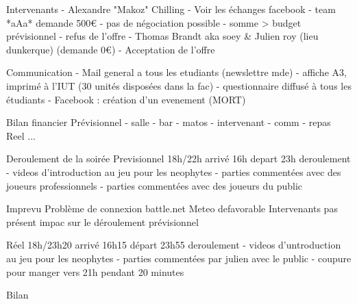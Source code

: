 	Intervenants
    - Alexandre "Makoz" Chilling
      - Voir les échanges facebook
		- team *aAa* demande 500€
                    - pas de négociation possible
                    - somme > budget prévisionnel
                    - refus de l'offre
    - Thomas Brandt aka soey & Julien roy (lieu dunkerque) (demande 0€)
        - Acceptation de l'offre

        Communication
                - Mail general a tous les etudiants (newslettre mde)
                - affiche A3, imprimé à l'IUT (30 unités disposées dans la fac)
                - questionnaire diffusé à tous les étudiants
                - Facebook : création d'un evenement (MORT)

        Bilan financier
                Prévisionnel
                    - salle
                    - bar
                    - matos
                    - intervenant
                    - comm
                    - repas
                Reel
                   ...

        Deroulement de la soirée
                Previsionnel
                    18h/22h
                    arrivé 16h
                    depart 23h
                    deroulement
                        - videos d'introduction au jeu pour les neophytes
                        - parties commentées avec des joueurs professionnels
                        - parties commentées avec des joueurs du public

                Imprevu
                   Problème de connexion battle.net
                   Meteo defavorable
                   Intervenants pas présent
                   impac sur le déroulement prévisionnel

                Réel
                    18h/23h20
                    arrivé 16h15
                    départ 23h55
                    deroulement
                        - videos d'untroduction au jeu pour les neophytes
                        - parties commentées par julien avec le public
                        - coupure pour manger vers 21h pendant 20 minutes

Bilan
